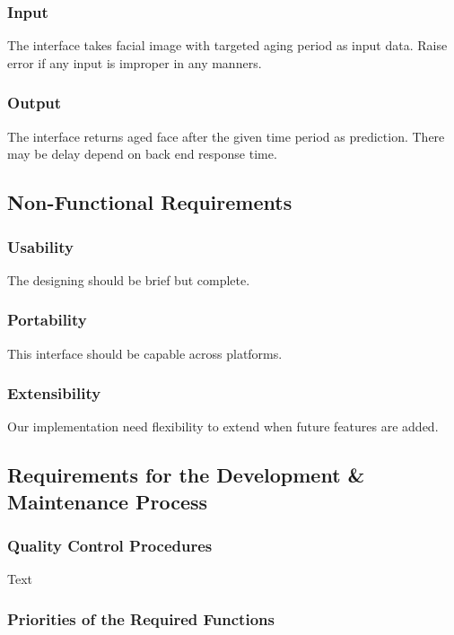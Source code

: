 \documentclass[12pt]{article}
\begin{document}
\subsubsection{Input}\label{input}
The interface takes facial image with targeted aging period as input data. Raise error if any input is improper in any manners.
\subsubsection{Output}
The interface returns aged face after the given time period as prediction. There may be delay depend on back end response time.

\subsection{Non-Functional Requirements}

\subsubsection {Usability}

The designing should be brief but complete.

\subsubsection {Portability}

This interface should be capable across platforms.

\subsubsection {Extensibility}
 
Our implementation need flexibility to extend when future features are added.

\subsection{Requirements for the Development \& Maintenance Process}

\subsubsection {Quality Control Procedures}

Text

\subsubsection {Priorities of the Required Functions}
\end{document}
